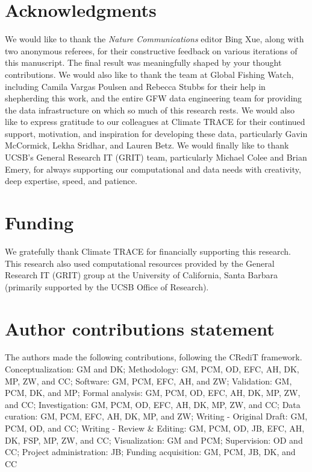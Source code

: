 \documentclass[lineno,pdflatex,sn-nature]{sn-jnl}
\begin{document}

\clearpage 





\section*{Acknowledgments}

We would like to thank the \textit{Nature Communications} editor Bing Xue, along with two anonymous referees, for their constructive feedback on various iterations of this manuscript. The final result was meaningfully shaped by your thought contributions. We would also like to thank the team at Global Fishing Watch, including Camila Vargas Poulsen and Rebecca Stubbs for their help in shepherding this work, and the entire GFW data engineering team for providing the data infrastructure on which so much of this research rests. We would also like to express gratitude to our colleagues at Climate TRACE for their continued support, motivation, and inspiration for developing these data, particularly Gavin McCormick, Lekha Sridhar, and Lauren Betz. We would finally like to thank UCSB's General Research IT (GRIT) team, particularly Michael Colee and Brian Emery, for always supporting our computational and data needs with creativity, deep expertise, speed, and patience.

\section*{Funding}

We gratefully thank Climate TRACE for financially supporting this research. This research also used computational resources provided by the General Research IT (GRIT) group at the University of California, Santa Barbara (primarily supported by the UCSB Office of Research).

\section*{Author contributions statement}

The authors made the following contributions, following the CRediT framework. Conceptualization: GM and DK; Methodology: GM, PCM, OD, EFC, AH, DK, MP, ZW, and CC; Software: GM, PCM, EFC, AH, and ZW; Validation: GM, PCM, DK, and MP; Formal analysis: GM, PCM, OD, EFC, AH, DK, MP, ZW, and CC; Investigation: GM, PCM, OD, EFC, AH, DK, MP, ZW, and CC; Data curation: GM, PCM, EFC, AH, DK, MP, and ZW; Writing - Original Draft: GM, PCM, OD, and CC; Writing - Review \& Editing: GM, PCM, OD, JB, EFC, AH, DK, FSP, MP, ZW, and CC; Visualization: GM and PCM; Supervision: OD and CC; Project administration: JB; Funding acquisition: GM, PCM, JB, DK, and CC
\end{document}
